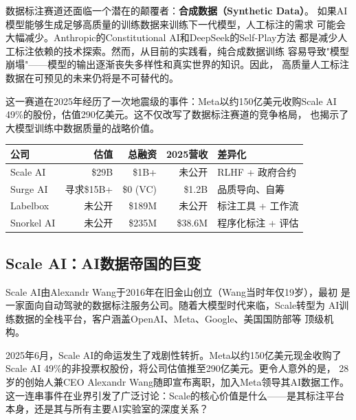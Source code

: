 数据标注赛道还面临一个潜在的颠覆者：\textbf{合成数据（Synthetic Data）}。
如果AI模型能够生成足够高质量的训练数据来训练下一代模型，人工标注的需求
可能会大幅减少。Anthropic的Constitutional AI和DeepSeek的Self-Play方法
都是减少人工标注依赖的技术探索。然而，从目前的实践看，纯合成数据训练
容易导致"模型崩塌"——模型的输出逐渐丧失多样性和真实世界的知识。因此，
高质量人工标注数据在可预见的未来仍将是不可替代的。

这一赛道在2025年经历了一次地震级的事件：Meta以约150亿美元收购Scale AI
49\%的股份，估值290亿美元。这不仅改写了数据标注赛道的竞争格局，
也揭示了大模型训练中数据质量的战略价值。

\begin{keybox}[数据标注赛道核心数据对比]
\small
\begin{tabularx}{\textwidth}{l r r r l}
\toprule
\rowcolor{figLightGray}
\textbf{公司} & \textbf{估值} & \textbf{总融资} & \textbf{2025营收} & \textbf{差异化} \\
\midrule
Scale AI    & \$29B   & \$1B+    & 未公开       & RLHF + 政府合约 \\
Surge AI    & 寻求\$15B+ & \$0 (VC)  & \$1.2B   & 品质导向、自筹 \\
Labelbox    & 未公开  & \$189M   & 未公开       & 标注工具 + 工作流 \\
Snorkel AI  & 未公开  & \$235M   & \$38.6M      & 程序化标注 + 评估 \\
\bottomrule
\end{tabularx}
\end{keybox}

\subsection{Scale AI：AI数据帝国的巨变}
\label{subsec:scale-ai}

Scale AI由Alexandr Wang于2016年在旧金山创立（Wang当时年仅19岁），最初
是一家面向自动驾驶的数据标注服务公司。随着大模型时代来临，Scale转型为
AI训练数据的全栈平台，客户涵盖OpenAI、Meta、Google、美国国防部等
顶级机构。

2025年6月，Scale AI的命运发生了戏剧性转折。Meta以约150亿美元现金收购了
Scale AI 49\%的非投票权股份，将公司估值推至290亿美元。更令人意外的是，
28岁的创始人兼CEO Alexandr Wang随即宣布离职，加入Meta领导其AI数据工作。
这一连串事件在业界引发了广泛讨论：Scale的核心价值是什么——是其标注平台
本身，还是其与所有主要AI实验室的深度关系？

